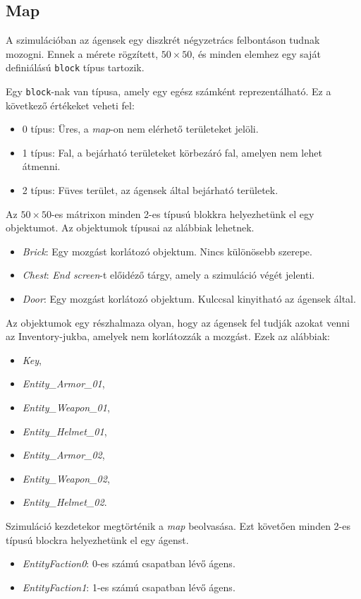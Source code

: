 \subsection{Map}

A szimulációban az ágensek egy diszkrét négyzetrács felbontáson tudnak mozogni. Ennek a mérete rögzített, $50 \times 50$, és minden elemhez egy saját definiálású \texttt{block} típus tartozik.

Egy \texttt{block}-nak van típusa, amely egy egész számként reprezentálható. Ez a következő értékeket veheti fel:
\begin{itemize}
\item 0 típus: Üres, a \textit{map}-on nem elérhető területeket jelöli.
\item 1 típus: Fal, a bejárható területeket körbezáró fal, amelyen nem lehet átmenni.
\item 2 típus: Füves terület, az ágensek által bejárható területek.
\end{itemize}

Az $50 \times 50$-es mátrixon minden 2-es típusú blokkra helyezhetünk el egy objektumot. Az objektumok típusai az alábbiak lehetnek.

\begin{itemize}
\item \textit{Brick}: Egy mozgást korlátozó objektum. Nincs különösebb szerepe.
\item \textit{Chest}: \textit{End screen}-t előidéző tárgy, amely a szimuláció végét jelenti.
\item \textit{Door}: Egy mozgást korlátozó objektum. Kulccsal kinyitható az ágensek által.
\end{itemize}

Az objektumok egy részhalmaza olyan, hogy az ágensek fel tudják azokat venni az Inventory-jukba, amelyek nem korlátozzák a mozgást. Ezek az alábbiak:
\begin{itemize}
\item \textit{Key},
\item \textit{Entity\_Armor\_01},
\item \textit{Entity\_Weapon\_01},
\item \textit{Entity\_Helmet\_01},
\item \textit{Entity\_Armor\_02},
\item \textit{Entity\_Weapon\_02},
\item \textit{Entity\_Helmet\_02}.
\end{itemize}

Szimuláció kezdetekor megtörténik a \textit{map} beolvasása. Ezt követően minden 2-es típusú blockra helyezhetünk el egy ágenst.
\begin{itemize}
    \item \textit{EntityFaction0}: 0-es számú csapatban lévő ágens.
    \item \textit{EntityFaction1}: 1-es számú csapatban lévő ágens.
\end{itemize}

